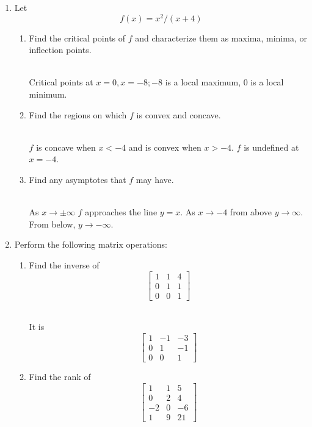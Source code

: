 \documentclass[11pt]{article}
\begin{document}
\begin{enumerate}
\ \\We need that limit as $x\rightarrow x_o$ of $f(x)$ equals ${1\over 2}x_o-10$ for all $x_o$.  For any $\epsilon>0$, we can find a $\delta>0$ such that $|{1\over 2}x-10-{1\over 2}x_o+10|<\epsilon$ whenever $|x-x_o|<\delta$.  Rearranging, we get ${1\over 2}|x-x_o|<\epsilon$ when $|x-x_o|<\delta$.  Setting $\delta={2} \epsilon$ proves the result.

\vspace{.2in}
\item Let $$f(x)=x^2/(x+4)$$
\begin{enumerate}
\item Find the critical points of $f$ and characterize them as maxima, minima, or inflection points.

\ \\Critical points at $x=0, x=-8; -8$ is a local maximum, $0$ is a local minimum.
\item Find the regions on which $f$ is convex and concave.

\ \\ $f$ is concave when $x< -4$ and is convex when $x>-4$. $f$ is undefined at $x=-4$.
\item Find any asymptotes that $f$ may have.

\ \\ As $x\rightarrow \pm\infty$ $f$ approaches the line $y=x$. As $x\rightarrow -4$ from above $y\rightarrow \infty$.  From below, $y\rightarrow -\infty$.

\end{enumerate}

\item Perform the following matrix operations:

\begin{enumerate}
\item Find the inverse of $$\begin{bmatrix}1 & 1& 4\\ 0& 1& 1\\0&0&1
\end{bmatrix}$$

\ \\ It is $$\begin{bmatrix}1 & -1& -3\\ 0& 1& -1\\0&0&1 \end{bmatrix}$$

\newpage

\item Find the rank of 
$$\begin{bmatrix} 
1& 1& 5\\
0& 2& 4\\
-2& 0& -6\\
1& 9& 21
\end{bmatrix}$$


\end{enumerate}
\end{enumerate}
\end{document}

